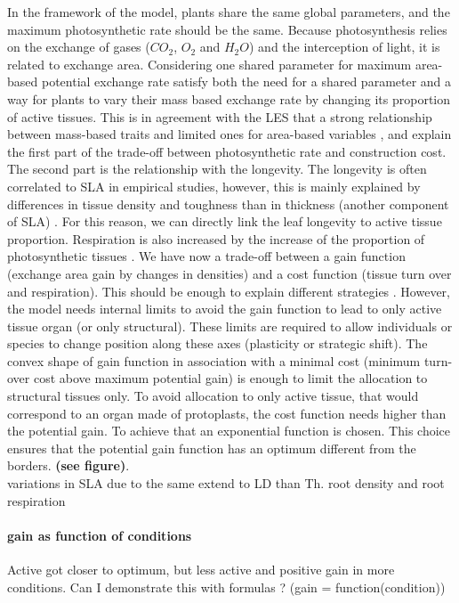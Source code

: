 In the framework of the model, plants share the same global parameters, and the maximum photosynthetic rate should be the same. Because photosynthesis relies on the exchange of gases ($CO_2$, $O_2$ and $H_2O$) and the interception of light, it is related to exchange area. Considering one shared parameter for maximum area-based potential exchange rate satisfy both the need for a shared parameter and a way for plants to vary their mass based exchange rate by changing its proportion of active tissues. This is in agreement with the LES that a strong relationship between mass-based traits and limited ones for area-based variables \cite{wright_worldwide_2004}, and explain the first part of the trade-off between photosynthetic rate and construction cost. The second part is the relationship with the longevity. The longevity is often correlated to SLA in empirical studies, however, this is mainly explained by differences in tissue density and toughness than in thickness (another component of SLA) \cite{}. For this reason, we can directly link the leaf longevity to active tissue proportion. Respiration is also increased by the increase of the proportion of photosynthetic tissues \cite{kleidon, reich}. We have now a trade-off between a gain function (exchange area gain by changes in densities) and a cost function (tissue turn over and respiration). This should be enough to explain different strategies \cite{westoby}. However, the model needs internal limits to avoid the gain function to lead to only active tissue organ (or only structural). These limits are required to allow individuals or species to change position along these axes (plasticity or strategic shift). The convex shape of gain function in association with a minimal cost (minimum turn-over cost above maximum potential gain) is enough to limit the allocation to structural tissues only. To avoid allocation to only active tissue, that would correspond to an organ made of protoplasts, the cost function needs higher than the potential gain. To achieve that an exponential function is chosen. This choice ensures that the potential gain function has an optimum different from the borders. \textbf{(see figure)}.\\


\cite{poorter_causes_2009} variations in SLA due to the same extend to LD than Th.
\cite{picon-cochard_effect_2012}root density and root respiration

\paragraph{gain as function of conditions}
Active got closer to optimum, but less active and positive gain in more conditions. Can I demonstrate this with formulas ? (gain = function(condition))
\\

